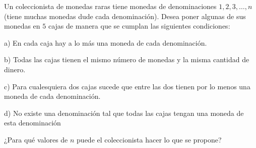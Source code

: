 Un coleccionista de monedas raras tiene monedas de denominaciones $1,2,3,\dots,n$ (tiene muchas monedas dude cada denominación). Desea poner algunas de sus monedas en $5$ cajas de manera que se cumplan las siguientes condiciones:

a) En cada caja hay a lo más una moneda de cada denominación.

b) Todas las cajas tienen el mismo número de monedas y la misma cantidad de dinero.

c) Para cualesquiera dos cajas sucede que entre las dos tienen por lo menos una moneda de cada denominación.

d) No existe una denominación tal que todas las cajas tengan una moneda de esta denominación

¿Para qué valores de $n$ puede el coleccionista hacer lo que se propone?